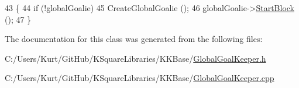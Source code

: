 \begin{DoxyCode}
43 \{
44   \textcolor{keywordflow}{if}  (!globalGoalie)
45     CreateGlobalGoalie ();
46   globalGoalie->\hyperlink{class_k_k_b_1_1_goal_keeper_a2a9565f88cee7b4339c24ed4d5155419}{StartBlock} ();
47 \}
\end{DoxyCode}


The documentation for this class was generated from the following files\+:\begin{DoxyCompactItemize}
\item 
C\+:/\+Users/\+Kurt/\+Git\+Hub/\+K\+Square\+Libraries/\+K\+K\+Base/\hyperlink{_global_goal_keeper_8h}{Global\+Goal\+Keeper.\+h}\item 
C\+:/\+Users/\+Kurt/\+Git\+Hub/\+K\+Square\+Libraries/\+K\+K\+Base/\hyperlink{_global_goal_keeper_8cpp}{Global\+Goal\+Keeper.\+cpp}\end{DoxyCompactItemize}
